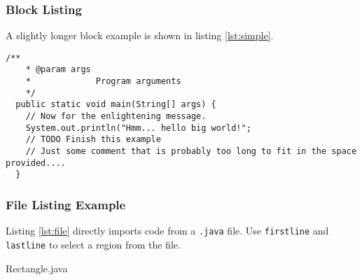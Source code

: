 \documentclass{beamer}
\begin{document}
\begin{frame}[fragile]
  \frametitle{Block Listing}

  A slightly longer block example is shown in listing \ref{lst:simple}.

\begin{lstlisting}[caption={A simple listing.}, label={lst:simple}]
  /**
    * @param args
    *             Program arguments
    */
  public static void main(String[] args) {
    // Now for the enlightening message.
    System.out.println("Hmm... hello big world!";
    // TODO Finish this example
    // Just some comment that is probably too long to fit in the space provided....
  }
\end{lstlisting}

\end{frame}
  
\begin{frame}[fragile]
  \frametitle{File Listing Example}

  Listing \ref{lst:file} directly imports code from a \texttt{.java} file. Use
  \texttt{firstline} and \texttt{lastline} to select a region from the
  file.

  
  {Rectangle.java}

  
  
\end{frame}
\end{document}

